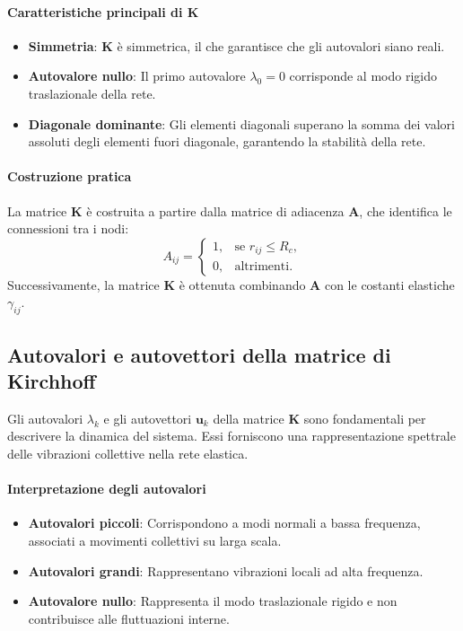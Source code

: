 \documentclass[Lau,binding=0.6cm,oneside,noexaminfo]{sapthesis}
\begin{document}
\paragraph{Caratteristiche principali di $\mathbf{K}$}
\begin{itemize}
    \item \textbf{Simmetria}: $\mathbf{K}$ è simmetrica, il che garantisce che gli autovalori siano reali.
    \item \textbf{Autovalore nullo}: Il primo autovalore $\lambda_0 = 0$ corrisponde al modo rigido traslazionale della rete.
    \item \textbf{Diagonale dominante}: Gli elementi diagonali superano la somma dei valori assoluti degli elementi fuori diagonale, garantendo la stabilità della rete.
\end{itemize}

\paragraph{Costruzione pratica}
La matrice $\mathbf{K}$ è costruita a partire dalla matrice di adiacenza $\mathbf{A}$, che identifica le connessioni tra i nodi:
\begin{equation}
A_{ij} =
\begin{cases}
1, & \text{se } r_{ij} \leq R_c, \\
0, & \text{altrimenti.}
\end{cases}
\end{equation}
Successivamente, la matrice $\mathbf{K}$ è ottenuta combinando $\mathbf{A}$ con le costanti elastiche $\gamma_{ij}$.

\subsection{Autovalori e autovettori della matrice di Kirchhoff}

Gli autovalori $\lambda_k$ e gli autovettori $\mathbf{u}_k$ della matrice $\mathbf{K}$ sono fondamentali per descrivere la dinamica del sistema. Essi forniscono una rappresentazione spettrale delle vibrazioni collettive nella rete elastica.

\paragraph{Interpretazione degli autovalori}
\begin{itemize}
    \item \textbf{Autovalori piccoli}: Corrispondono a modi normali a bassa frequenza, associati a movimenti collettivi su larga scala.
    \item \textbf{Autovalori grandi}: Rappresentano vibrazioni locali ad alta frequenza.
    \item \textbf{Autovalore nullo}: Rappresenta il modo traslazionale rigido e non contribuisce alle fluttuazioni interne.
\end{itemize}
\end{document}
